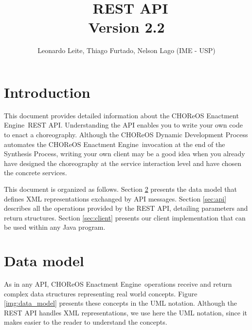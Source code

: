 \documentclass[a4paper, 10pt]{article}
\title{\ee\ REST API \\ {\normalsize Version 2.2}}
\author{Leonardo Leite, Thiago Furtado, Nelson Lago (IME - USP)}
\newcommand{\ee}{CHOReOS Enactment Engine}
\begin{document}
\maketitle

\section{Introduction}

This document provides detailed information about the \ee\ REST API. 
Understanding the API enables you to write your own code to enact a choreography.
Although the CHOReOS Dynamic Development Process automates the \ee\ invocation at the end of the Synthesis Process, writing your own client may be a good idea when you already have designed the choreography at the service interaction level and have chosen the concrete services. 

This document is organized as follows. Section \ref{sec:model} presents the data model that defines XML representations exchanged by API messages. Section \ref{sec:api} describes all the operations provided by the REST API, detailing parameters and return structures. Section \ref{sec:client} presents our client implementation that can be used within any Java program.

\section{Data model}
\label{sec:model}

As in any API, \ee\ operations receive and return complex data structures representing real world concepts. 
Figure \ref{img:data_model} presents these concepts in the UML notation.
Although the REST API handles XML representations, we use here the UML notation, since it makes easier to the reader to understand the concepts.
\end{document}
